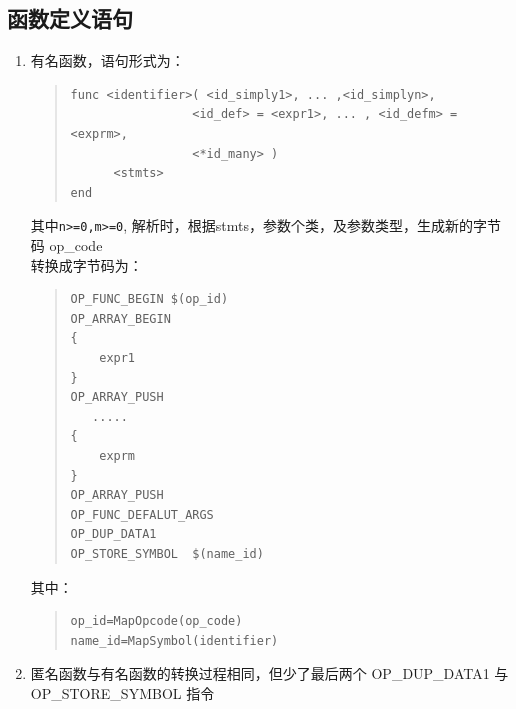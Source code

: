 \subsection{函数定义语句}
\begin{enumerate}
\item 有名函数，语句形式为：
\begin{quote}
\begin{verbatim}
func <identifier>( <id_simply1>, ... ,<id_simplyn>,
                 <id_def> = <expr1>, ... , <id_defm> = <exprm>,
                 <*id_many> )
      <stmts>
end 
\end{verbatim}
\end{quote}
其中\verb|n>=0,m>=0|, 解析时，根据stmts，参数个类，及参数类型，生成新的字节码 op\_code \\
转换成字节码为：
\begin{quote}
\begin{verbatim}
OP_FUNC_BEGIN $(op_id)
OP_ARRAY_BEGIN
{
    expr1
}
OP_ARRAY_PUSH
   .....
{
    exprm
}
OP_ARRAY_PUSH
OP_FUNC_DEFALUT_ARGS
OP_DUP_DATA1
OP_STORE_SYMBOL  $(name_id)
\end{verbatim}
\end{quote}
其中：
\begin{quote}
\begin{verbatim}
op_id=MapOpcode(op_code) 
name_id=MapSymbol(identifier)
\end{verbatim}
\end{quote}
\item 匿名函数与有名函数的转换过程相同，但少了最后两个 OP\_DUP\_DATA1 与 OP\_STORE\_SYMBOL 指令
\end{enumerate}

